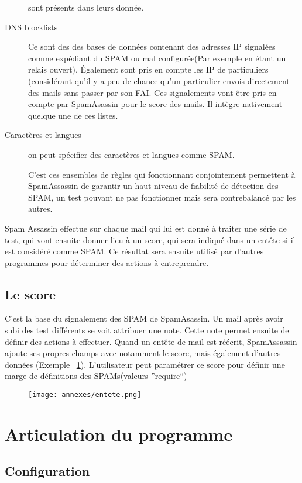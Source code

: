 \documentclass[a4paper,11pt]{article}
\begin{document}
\begin{description}
 sont présents dans leurs donnée.
 \item [DNS blocklists] Ce sont des des bases de données contenant des adresses IP signalées comme expédiant du SPAM ou mal 
 configurée(Par exemple en étant un relais ouvert). Également sont pris en compte les IP de particuliers (considérant qu'il y a peu de chance
qu'un particulier envois directement des mails sans passer par son FAI. Ces signalements vont être pris en compte par SpamAsassin pour le score des mails.
Il intègre nativement quelque une de ces listes.
\item [Caractères et langues] on peut spécifier des caractères et langues comme SPAM.

C'est ces ensembles de règles qui fonctionnant conjointement permettent à SpamAssassin de garantir un haut 
niveau de fiabilité de détection des SPAM, un test pouvant ne pas fonctionner mais sera contrebalancé par les autres.
 \end{description} 


Spam Assassin effectue sur chaque mail qui lui est donné à traiter une série de test, qui vont ensuite donner lieu à un score, qui sera indiqué dans un entête si il est considéré comme SPAM. 
Ce résultat sera ensuite utilisé par d'autres programmes pour déterminer des actions à entreprendre.


\subsection{Le score} \label{score}
C'est la base du signalement des SPAM de SpamAsassin. Un mail après avoir subi des test différents se voit attribuer une note. Cette note permet
ensuite de définir des actions à effectuer. Quand un entête de mail est réécrit, SpamAssassin ajoute ses propres champs avec
notamment le score, mais également d'autres données (Exemple ~\ref{fig:ex_score}). L'utilisateur peut paramétrer ce 
score pour définir une marge de définitions des SPAMs(valeurs ''require``)

\begin{figure}[b]
 \texttt{[image: annexes/entete.png]}
 \label{fig:ex_score}
\end{figure}

\pagebreak

\section{Articulation du programme}

\subsection{Configuration}
\end{document}

